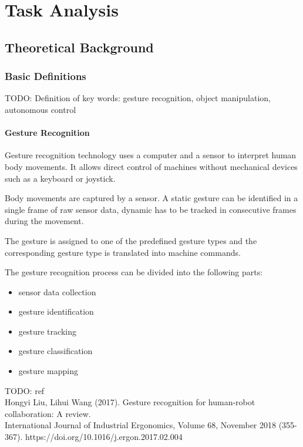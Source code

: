 \chapter{Task Analysis}


\section{Theoretical Background}

\subsection{Basic Definitions}
TODO: Definition of key words:
gesture recognition, object manipulation, autonomous control

\subsubsection{Gesture Recognition}
Gesture recognition technology uses a computer and a sensor to interpret human body movements. It allows direct control of machines without mechanical devices such as a keyboard or joystick.\par
Body movements are captured by a sensor. A static gesture can be identified in a single frame of raw sensor data, dynamic has to be tracked in consecutive frames during the movement.\par
The gesture is assigned to one of the predefined gesture types and the corresponding gesture type is translated into machine commands.\par
The gesture recognition process can be divided into the following parts:\par
\begin{itemize}
	\item sensor data collection
    \item gesture identification
    \item gesture tracking
    \item gesture classification
    \item gesture mapping
\end{itemize}

TODO: ref \\
Hongyi Liu, Lihui Wang (2017). Gesture recognition for human-robot collaboration: A review.\\
International Journal of Industrial Ergonomics, Volume 68, November 2018 (355-367).
https://doi.org/10.1016/j.ergon.2017.02.004\\

